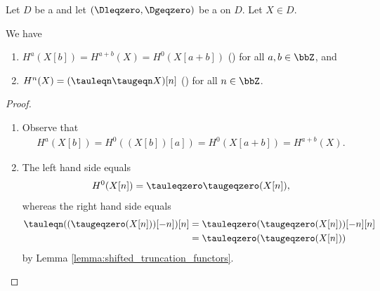 \begin{lemma} \label{lemma:indices_of_cohomology_for_t_structures}
    Let $D$ be a  and let $(\Dleqzero, \Dgeqzero)$ be a  on $D$. Let $X \in D$. 
    
    We have 
    \begin{enumerate}
    \item $H^a(X[b]) = H^{a+b}(X) = H^0(X[a+b])$ () for all $a,b \in \bbZ$, and
    \item $H^n(X) = (\tauleqn \taugeqn X)[n]$ ()  for all $n \in \bbZ$. 
    \end{enumerate}
\end{lemma}

\begin{proof}
    \begin{enumerate}
        \item Observe that
        \begin{align*}
            H^a(X[b]) = H^0((X[b])[a]) = H^0(X[a+b]) = H^{a+b}(X).
        \end{align*}

        \item The left hand side equals
        \begin{align*}
            H^0(X[n]) = \tauleqzero \taugeqzero (X[n]),
        \end{align*}
        whereas the right hand side equals
        \begin{align*}
            \tauleqn((\taugeqzero(X[n]))[-n])[n] &= \tauleqzero(\taugeqzero(X[n]))[-n][n] \\
            &= \tauleqzero(\taugeqzero(X[n]))
        \end{align*}
        by Lemma \ref{lemma:shifted_truncation_functors}.
    \end{enumerate}
\end{proof}